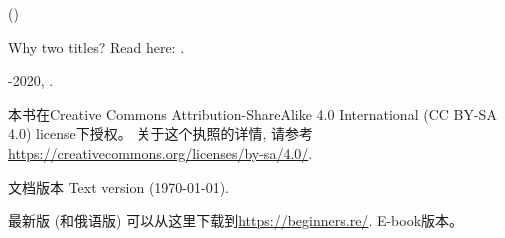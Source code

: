 \documentclass[UTF8,nofonts]{ctexart}
\begin{document}

\begin{titlepage}


\end{titlepage}

\newpage

\begin{center}
\vspace*{\fill}
{\LARGE \TitleMain}

\bigskip

{\large (\TitleAux)}

\bigskip
\bigskip
Why two titles? Read here: . %

\vspace*{\fill}

{\large \AUTHOR}

{\large \TT{\EMAILPRI}}
\vspace*{\fill}
\vfill

\ccbysa

-2020, \AUTHOR. 

本书在Creative Commons Attribution-ShareAlike 4.0 International (CC BY-SA 4.0) license下授权。
关于这个执照的详情, 请参考\url{https://creativecommons.org/licenses/by-sa/4.0/}.

文档版本 Text version ({\large \today}).

最新版 (和俄语版) 可以从这里下载到\url{https://beginners.re/}.
E-book版本。

\end{center}
\end{document}
